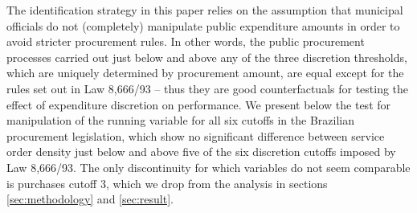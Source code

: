 \documentclass[11pt]{article}
\begin{document}
The identification strategy in this paper relies on the assumption that municipal officials do not (completely) manipulate public expenditure amounts in order to avoid stricter procurement rules. In other words, the public procurement processes carried out just below and above any of the three discretion thresholds, which are uniquely determined by procurement amount, are equal except for the rules set out in Law 8,666/93 -- thus they are good counterfactuals for testing the effect of expenditure discretion on performance. We present below the \citet{McCraryManipulationRunningVariable2008} test for manipulation of the running variable for all six cutoffs in the Brazilian procurement legislation, which show no significant difference between service order density just below and above five of the six discretion cutoffs imposed by Law 8,666/93. The only discontinuity for which variables do not seem comparable is purchases cutoff 3, which we drop from the analysis in sections \ref{sec:methodology} and \ref{sec:result}.
\end{document}
